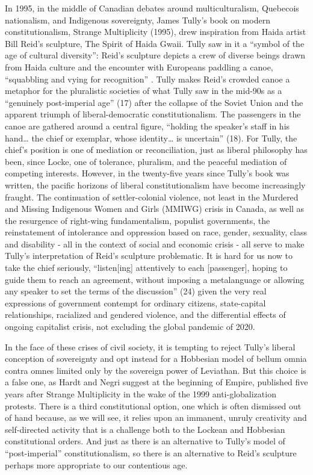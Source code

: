 \documentclass[12pt,oneside]{memoir}
\begin{document}
In 1995, in the middle of Canadian debates around multiculturalism, Quebecois nationalism, and Indigenous sovereignty, James Tully's book on modern constitutionalism, Strange Multiplicity (1995), drew inspiration from Haida artist Bill Reid's sculpture, The Spirit of Haida Gwaii. Tully saw in it a ``symbol of the age of cultural diversity'': Reid's sculpture depicts a crew of diverse beings drawn from Haida culture and the encounter with Europeans paddling a canoe, ``squabbling and vying for recognition'' \citep[24]{Tully1995}. Tully makes Reid's crowded canoe a metaphor for the pluralistic societies of what Tully saw in the mid-90s as a ``genuinely post-imperial age'' (17) after the collapse of the Soviet Union and the apparent triumph of liberal-democratic constitutionalism. The passengers in the canoe are gathered around a central figure, ``holding the speaker's staff in his hand{\ldots} the chief or exemplar, whose identity{\ldots} is uncertain'' (18). For Tully, the chief's position is one of mediation or reconciliation, just as liberal philosophy has been, since Locke, one of tolerance, pluralism, and the peaceful mediation of competing interests. However, in the twenty-five years since Tully's book was written, the pacific horizons of liberal constitutionalism have become increasingly fraught. The continuation of settler-colonial violence, not least in the Murdered and Missing Indigenous Women and Girls (MMIWG) crisis in Canada, as well as the resurgence of right-wing fundamentalism, populist governments, the reinstatement of intolerance and oppression based on race, gender, sexuality, class and disability - all in the context of social and economic crisis - all serve to make Tully's interpretation of Reid's sculpture problematic. It is hard for us now to take the chief seriously,  ``listen[ing] attentively to each [passenger], hoping to guide them to reach an agreement, without imposing a metalanguage or allowing any speaker to set the terms of the discussion'' (24) given the very real expressions of government contempt for ordinary citizens, state-capital relationships, racialized and gendered violence, and the differential effects of ongoing capitalist crisis, not excluding the global pandemic of 2020.

In the face of these crises of civil society, it is tempting to reject Tully's liberal conception of sovereignty and opt instead for a Hobbesian model of bellum omnia contra omnes limited only by the sovereign power of Leviathan. But this choice is a false one, as Hardt and Negri suggest at the beginning of Empire, published five years after Strange Multiplicity in the wake of the 1999 anti-globalization protests. There is a third constitutional option, one which is often dismissed out of hand because, as we will see, it relies upon an immanent, unruly creativity and self-directed activity that is a challenge both to the Lockean and Hobbesian constitutional orders. And just as there is an alternative to Tully's model of ``post-imperial'' constitutionalism, so there is an alternative to Reid's sculpture perhaps more appropriate to our contentious age.
\end{document}
